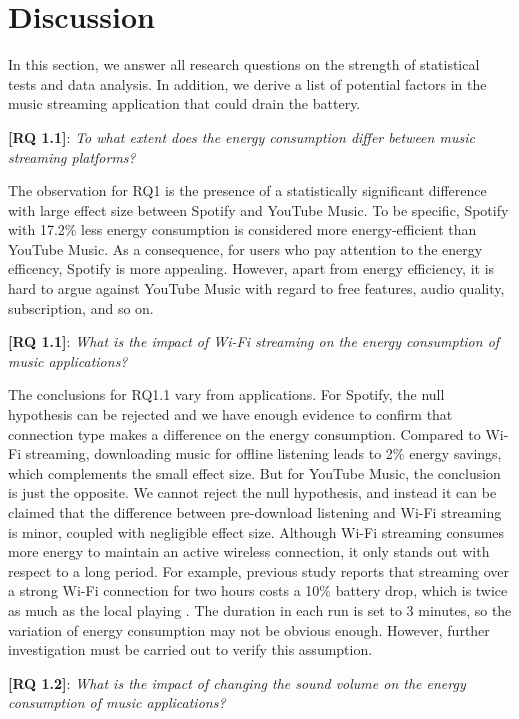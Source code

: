 \section{Discussion}
In this section, we answer all research questions on the strength of statistical tests and data analysis. In addition, we derive a list of potential factors in the music streaming application that could drain the battery. 

\textbf{[RQ 1.1]}: \emph{To what extent does the energy consumption differ between music streaming platforms?
}

The observation for RQ1 is the presence of a statistically significant difference with large effect size between Spotify and YouTube Music. To be specific, Spotify with 17.2\% less energy consumption is considered more energy-efficient than YouTube Music. As a consequence, for users who pay attention to the energy efficency, Spotify is more appealing. However, apart from energy efficiency, it is hard to argue against YouTube Music with regard to free features, audio quality, subscription, and so on. 

\textbf{[RQ 1.1]}: \emph{What is the impact of Wi-Fi streaming on the energy consumption of music applications?
}

The conclusions for RQ1.1 vary from applications. For Spotify, the null hypothesis can be rejected and we have enough evidence to confirm that connection type makes a difference on the energy consumption. Compared to Wi-Fi streaming, downloading music for offline listening leads to 2\% energy savings, which complements the small effect size. But for YouTube Music, the conclusion is just the opposite. We cannot reject the null hypothesis, and instead it can be claimed that the difference between pre-download listening and Wi-Fi streaming is minor, coupled with negligible effect size. Although Wi-Fi streaming consumes more energy to maintain an active wireless connection, it only stands out with respect to a long period. For example, previous study reports that streaming over a strong Wi-Fi connection for two hours costs a 10\% battery drop, which is twice as much as the local playing \cite{32}. The duration in each run is set to 3 minutes, so the variation of energy consumption may not be obvious enough. However, further investigation must be carried out to verify this assumption. 

\textbf{[RQ 1.2]}: \emph{What is the impact of changing the sound volume on the energy consumption of music applications?}

